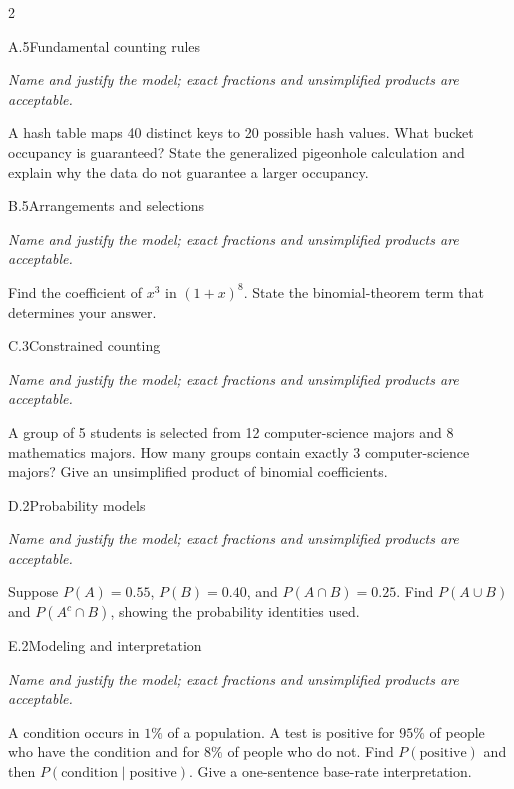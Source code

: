 \documentclass[9pt]{extarticle}
\begin{document}
\CoreWorkArea
\FormBreak
{}
\begin{multicols}{2}
\begin{CoreProblem}{A.5}{Fundamental counting rules}
{\scriptsize\textit{Name and justify the model; exact fractions and unsimplified products are acceptable.}\par}
A hash table maps 40 distinct keys to 20 possible hash values. What
    bucket occupancy is guaranteed? State the generalized pigeonhole calculation
    and explain why the data do not guarantee a larger occupancy.
\end{CoreProblem}
\begin{CoreProblem}{B.5}{Arrangements and selections}
{\scriptsize\textit{Name and justify the model; exact fractions and unsimplified products are acceptable.}\par}
Find the coefficient of $x^3$ in $(1+x)^8$. State the binomial-theorem
    term that determines your answer.
\end{CoreProblem}
\begin{CoreProblem}{C.3}{Constrained counting}
{\scriptsize\textit{Name and justify the model; exact fractions and unsimplified products are acceptable.}\par}
A group of 5 students is selected from 12 computer-science majors and
    8 mathematics majors. How many groups contain exactly 3 computer-science
    majors? Give an unsimplified product of binomial coefficients.
\end{CoreProblem}
\columnbreak
\begin{CoreProblem}{D.2}{Probability models}
{\scriptsize\textit{Name and justify the model; exact fractions and unsimplified products are acceptable.}\par}
Suppose $P(A)=0.55$, $P(B)=0.40$, and $P(A\cap B)=0.25$. Find
    $P(A\cup B)$ and $P(A^c\cap B)$, showing the probability identities used.
\end{CoreProblem}
\begin{CoreProblem}{E.2}{Modeling and interpretation}
{\scriptsize\textit{Name and justify the model; exact fractions and unsimplified products are acceptable.}\par}
A condition occurs in $1\%$ of a population. A test is positive for
    $95\%$ of people who have the condition and for $8\%$ of people who do not.
    Find $P(\text{positive})$ and then
    $P(\text{condition}\mid\text{positive})$. Give a one-sentence base-rate
    interpretation.
\end{CoreProblem}
\end{multicols}
\end{document}
